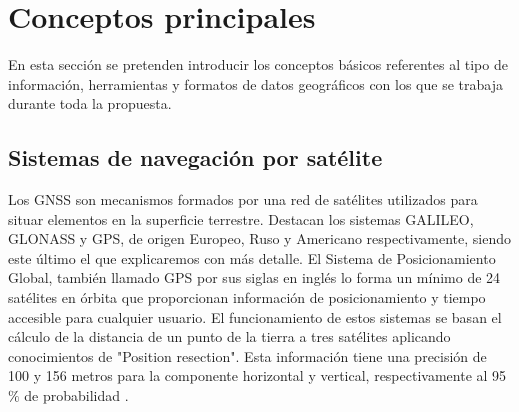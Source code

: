 

\chapter{Conceptos principales}
En esta sección se pretenden introducir los conceptos básicos referentes al tipo de información, 
herramientas y formatos de datos geográficos con los que se trabaja durante toda la propuesta.

\section{Sistemas de navegación por satélite}
Los \ac{GNSS} son mecanismos formados por una red de satélites utilizados 
para situar elementos en la superficie terrestre. Destacan los sistemas GALILEO, GLONASS y GPS,
de origen Europeo, Ruso y Americano respectivamente, siendo este último el que explicaremos 
con más detalle.
El Sistema de Posicionamiento Global, también llamado \ac{GPS} por sus siglas en inglés 
lo forma un mínimo de 24 satélites en órbita que proporcionan información de posicionamiento y tiempo 
accesible para cualquier usuario. El funcionamiento de estos sistemas se basan el cálculo de la 
distancia de un punto de la tierra a tres satélites aplicando conocimientos de "Position resection". \cite{Langley01}
Esta información tiene una precisión de 100 y 156 metros para la componente horizontal y vertical, 
respectivamente al 95$\%$ de probabilidad \cite{ElRabbany01}.

